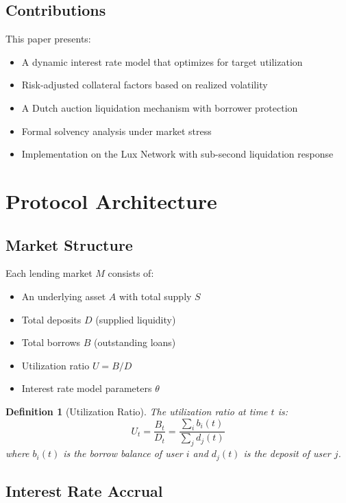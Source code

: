 \documentclass[11pt,a4paper]{article}
\newtheorem{definition}[theorem]{Definition}
\begin{document}
\subsection{Contributions}

This paper presents:
\begin{itemize}
    \item A dynamic interest rate model that optimizes for target utilization
    \item Risk-adjusted collateral factors based on realized volatility
    \item A Dutch auction liquidation mechanism with borrower protection
    \item Formal solvency analysis under market stress
    \item Implementation on the Lux Network with sub-second liquidation response
\end{itemize}

\section{Protocol Architecture}

\subsection{Market Structure}

Each lending market $M$ consists of:
\begin{itemize}
    \item An underlying asset $A$ with total supply $S$
    \item Total deposits $D$ (supplied liquidity)
    \item Total borrows $B$ (outstanding loans)
    \item Utilization ratio $U = B/D$
    \item Interest rate model parameters $\theta$
\end{itemize}

\begin{definition}[Utilization Ratio]
The utilization ratio at time $t$ is:
\begin{equation}
    U_t = \frac{B_t}{D_t} = \frac{\sum_i b_i(t)}{\sum_j d_j(t)}
\end{equation}
where $b_i(t)$ is the borrow balance of user $i$ and $d_j(t)$ is the deposit of user $j$.
\end{definition}

\subsection{Interest Rate Accrual}
\end{document}

